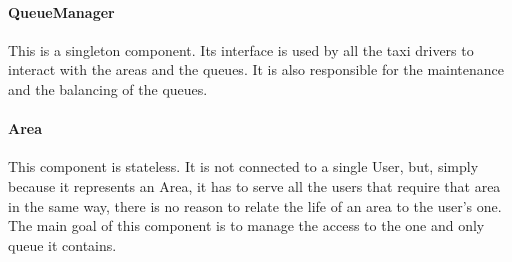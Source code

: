 		\paragraph{QueueManager}
		This is a singleton component. Its interface is used by all the taxi drivers to interact with the areas and
		the queues. It is also responsible for the maintenance and the balancing of the queues.
		\paragraph{Area}
		This component is stateless. It is not connected to a single User, but, simply because it represents an Area,
		it has to serve all the users that require that area in the same way, there is no reason to relate the
		life of an area to the user's one. The main goal of this component is to manage the access to the one and
		only queue it contains.
